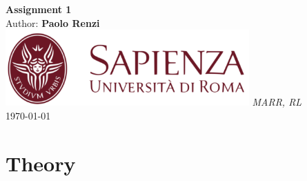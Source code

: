 \documentclass[10pt,a4paper]{article}
\begin{document}
\begin{titlepage}
    \begin{center}
        \vspace*{1cm}
        \Huge\textbf{Assignment 1}\\
        \vspace{1.5cm}
        \Large Author:
        \textbf{Paolo Renzi}\\
        \vspace{0.5cm}
        \vfill
        \includegraphics[width=0.7\textwidth]{images/sapienza_logo.png}
        \vfill
        \vspace{0.8cm}
        \Large \textit{MARR, RL}\\
        \today
    \end{center}
\end{titlepage}
\newpage

\section*{Theory}
\end{document}
